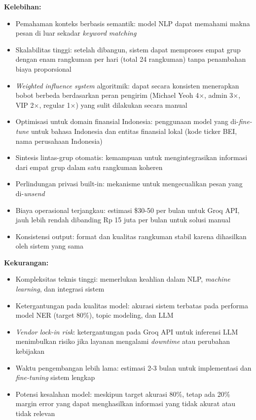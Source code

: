 \textbf{Kelebihan:}
\begin{itemize}
\item Pemahaman konteks berbasis semantik: model NLP dapat memahami makna pesan di luar sekadar \textit{keyword matching}
\item Skalabilitas tinggi: setelah dibangun, sistem dapat memproses empat grup dengan enam rangkuman per hari (total 24 rangkuman) tanpa penambahan biaya proporsional
\item \textit{Weighted influence system} algoritmik: dapat secara konsisten menerapkan bobot berbeda berdasarkan peran pengirim (Michael Yeoh 4×, admin 3×, VIP 2×, regular 1×) yang sulit dilakukan secara manual
\item Optimisasi untuk domain finansial Indonesia: penggunaan model yang di-\textit{fine-tune} untuk bahasa Indonesia dan entitas finansial lokal (kode ticker BEI, nama perusahaan Indonesia)
\item Sintesis lintas-grup otomatis: kemampuan untuk mengintegrasikan informasi dari empat grup dalam satu rangkuman koheren
\item Perlindungan privasi built-in: mekanisme untuk mengecualikan pesan yang di-\textit{unsend}
\item Biaya operasional terjangkau: estimasi \$30-50 per bulan untuk Groq API, jauh lebih rendah dibanding Rp 15 juta per bulan untuk solusi manual
\item Konsistensi output: format dan kualitas rangkuman stabil karena dihasilkan oleh sistem yang sama
\end{itemize}

\textbf{Kekurangan:}
\begin{itemize}
\item Kompleksitas teknis tinggi: memerlukan keahlian dalam NLP, \textit{machine learning}, dan integrasi sistem
\item Ketergantungan pada kualitas model: akurasi sistem terbatas pada performa model NER (target 80\%), topic modeling, dan LLM
\item \textit{Vendor lock-in risk}: ketergantungan pada Groq API untuk inferensi LLM menimbulkan risiko jika layanan mengalami \textit{downtime} atau perubahan kebijakan
\item Waktu pengembangan lebih lama: estimasi 2-3 bulan untuk implementasi dan \textit{fine-tuning} sistem lengkap
\item Potensi kesalahan model: meskipun target akurasi 80\%, tetap ada 20\% margin error yang dapat menghasilkan informasi yang tidak akurat atau tidak relevan
\end{itemize}

